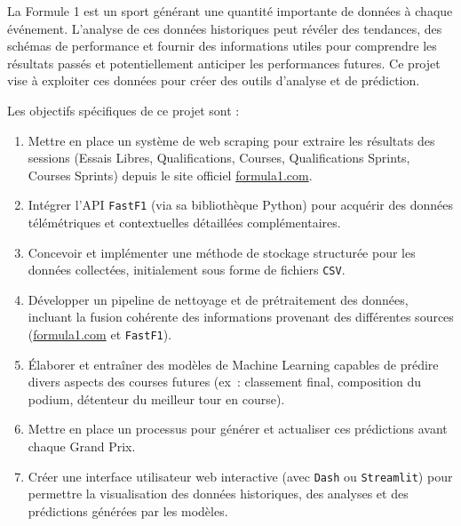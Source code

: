 \documentclass[11pt, a4paper]{article}
\newcommand{\lib}[1]{\texttt{#1}}
\begin{document}
\begin{description}[style=standard, itemsep=0.5em, leftmargin=1.5em]
    \item[Contexte~:] La Formule 1 est un sport générant une quantité importante de données à chaque événement. L'analyse de ces données historiques peut révéler des tendances, des schémas de performance et fournir des informations utiles pour comprendre les résultats passés et potentiellement anticiper les performances futures. Ce projet vise à exploiter ces données pour créer des outils d'analyse et de prédiction. %

    \item[Objectifs spécifiques~:] Les objectifs spécifiques de ce projet sont :
    \begin{enumerate}[label=\arabic*.~, wide, labelwidth=!, labelindent=0pt, leftmargin=*]
        \item Mettre en place un système de web scraping pour extraire les résultats des sessions (Essais Libres, Qualifications, Courses, Qualifications Sprints, Courses Sprints) depuis le site officiel \url{formula1.com}. %
        \item Intégrer l'API \lib{FastF1} (via sa bibliothèque Python) pour acquérir des données télémétriques et contextuelles détaillées complémentaires.
        \item Concevoir et implémenter une méthode de stockage structurée pour les données collectées, initialement sous forme de fichiers \lib{CSV}.
        \item Développer un pipeline de nettoyage et de prétraitement des données, incluant la fusion cohérente des informations provenant des différentes sources (\url{formula1.com} et \lib{FastF1}).
        \item Élaborer et entraîner des modèles de Machine Learning capables de prédire divers aspects des courses futures (ex~: classement final, composition du podium, détenteur du meilleur tour en course).
        \item Mettre en place un processus pour générer et actualiser ces prédictions avant chaque Grand Prix. %
        \item Créer une interface utilisateur web interactive (avec \lib{Dash} ou \lib{Streamlit}) pour permettre la visualisation des données historiques, des analyses et des prédictions générées par les modèles.
    \end{enumerate}
\end{description}
\end{document}
